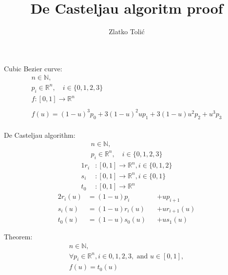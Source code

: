 \documentclass{article}
\title{De Casteljau algoritm proof}
\author{Zlatko Tolić}
\date{}
\begin{document}
	\maketitle
	Cubic Bezier curve:
	\begin{gather*}
		n \in \mathbb{N}, \\
		p_i \in \mathbb{R}^n, \quad i \in \{0, 1, 2, 3\} \\
		f : [0, 1] \rightarrow \mathbb{R}^n \\\\
		f(u) = (1-u)^3p_0  +  3(1-u)^2up_1 + 3(1-u)u^2p_2  +  u^3p_3 \\
	\end{gather*}

	De Casteljau algorithm:
	\begin{gather*}
		n \in \mathbb{N}, \\
		p_i \in \mathbb{R}^n, \quad i \in \{0, 1, 2, 3\}
	\end{gather*}
	\begin{alignat*}{1}
			r_i &: [0, 1] \rightarrow \mathbb{R}^n, i \in \{0, 1, 2\} \\
			s_i &: [0, 1] \rightarrow \mathbb{R}^n, i \in \{0, 1\} \\
			t_0 &: [0, 1] \rightarrow \mathbb{R}^n
	\end{alignat*}
	\begin{alignat*}{2}
		r_i(u) &= (1 - u)p_i    &&+ up_{i+1} \\
		s_i(u) &= (1 - u)r_i(u) &&+ ur_{i+1}(u) \\
		t_0(u) &= (1 - u)s_0(u) &&+ us_1(u)
	\end{alignat*}

	Theorem:
	\begin{gather*}
		n \in \mathbb{N}, \\
		\forall p_i \in \mathbb{R}^n, i \in {0, 1, 2, 3}, \text{ and } u \in [0, 1], \\
		f(u) = t_0(u) \\
	\end{gather*}
\end{document}

